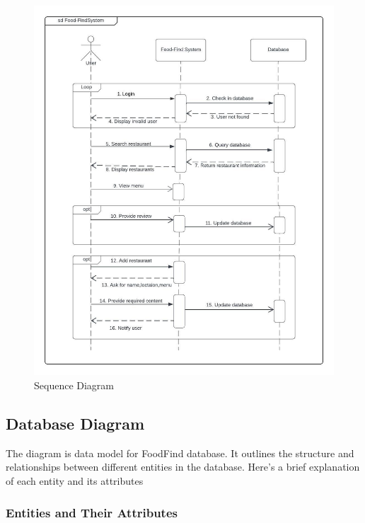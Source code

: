 \documentclass[12pt, a4paper, oneside]{article}
\begin{document}
\begin{figure}[H]
    \centering
    \includegraphics[width=\textwidth, height=\textheight, keepaspectratio]{images/sequence.jpg}
    \caption{Sequence Diagram}
    \label{fig:sequencediag}
\end{figure}


\pagebreak

\subsection{Database Diagram}

The diagram is data model for FoodFind database. It outlines the structure and relationships between different entities in the  database. Here's a brief explanation of each entity and its attributes

\subsubsection{Entities and Their Attributes}
\end{document}
